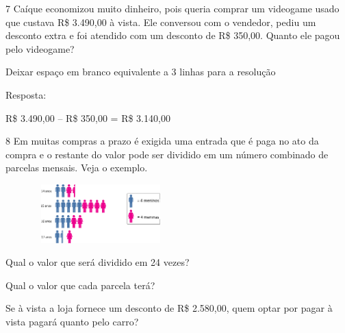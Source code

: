 \begin{multicols}{2}
{

\num{7} Caíque economizou muito dinheiro, pois queria comprar um videogame usado
que custava R\$ 3.490,00 à vista. Ele conversou com o vendedor, pediu
um desconto extra e foi atendido com um desconto de R\$ 350,00. Quanto ele pagou pelo videogame?

Deixar espaço em branco equivalente a 3 linhas para a resolução

Resposta:

R\$ 3.490,00 -- R\$ 350,00 = R\$ 3.140,00

\num{8} Em muitas compras a prazo é exigida uma entrada que é paga no ato da
compra e o restante do valor pode ser dividido em um número combinado de
parcelas mensais. Veja o exemplo.

\includegraphics[width=2.90025in,height=0.89174in]{media/image76.png}


\begin{escolha}

\item
  Qual o valor que será dividido em 24 vezes?

\item
  Qual o valor que cada parcela terá?

\item
  Se à vista a loja fornece um desconto de R\$ 2.580,00, quem optar por
  pagar à vista pagará quanto pelo carro?
\end{escolha}

}
\end{multicols}
